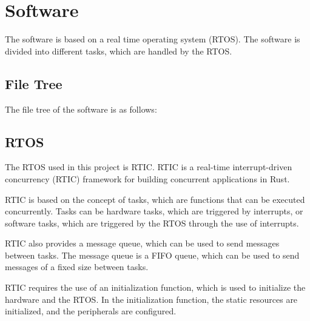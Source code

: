 \chapter{Software}\label{ch:system-development}
The software is based on a real time operating system (RTOS).
The software is divided into different tasks, which are handled by the RTOS.


\section{File Tree}
The file tree of the software is as follows:



\section{RTOS}
The RTOS used in this project is RTIC.
RTIC is a real-time interrupt-driven concurrency (RTIC) framework for building concurrent applications in Rust.

RTIC is based on the concept of tasks, which are functions that can be executed concurrently.
Tasks can be hardware tasks, which are triggered by interrupts, or software tasks, which are triggered by the RTOS through the use of interrupts.

RTIC also provides a message queue, which can be used to send messages between tasks.
The message queue is a FIFO queue, which can be used to send messages of a fixed size between tasks.

RTIC requires the use of an initialization function, which is used to initialize the hardware and the RTOS.
In the initialization function, the static resources are initialized, and the peripherals are configured.



